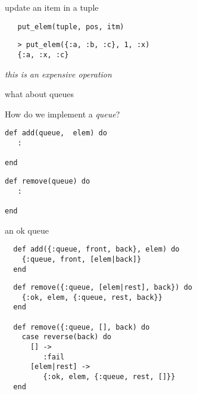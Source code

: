 \begin{frame}[fragile]{update an item in a tuple}

\begin{verbatim}
   put_elem(tuple, pos, itm)
\end{verbatim}
  \vspace{20pt}\pause
\begin{verbatim}
   > put_elem({:a, :b, :c}, 1, :x) 
   {:a, :x, :c}
\end{verbatim}

  \vspace{10pt}\pause
  {\em this is an expensive operation}
\end{frame}



\begin{frame}[fragile]{what about queues}

  How do we implement a {\em queue}?

\begin{verbatim}
def add(queue,  elem) do
   :

end
\end{verbatim}

\begin{verbatim}
def remove(queue) do
   :

end
\end{verbatim}  
  
\end{frame}

\begin{frame}[fragile]{an ok queue}

\begin{verbatim}
  def add({:queue, front, back}, elem) do
    {:queue, front, [elem|back]}
  end
\end{verbatim}

\begin{verbatim}
  def remove({:queue, [elem|rest], back}) do
    {:ok, elem, {:queue, rest, back}}
  end

  def remove({:queue, [], back) do 
    case reverse(back) do
      [] -> 
         :fail
      [elem|rest] ->
         {:ok, elem, {:queue, rest, []}}
  end
\end{verbatim}
  
\end{frame}


